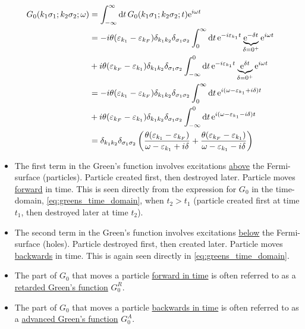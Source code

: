 \begin{align*} 
G_0(k_1\sigma_1;k_2\sigma_2;\omega) &= \int_{-\infty}^\infty\dd{t}G_0(k_1\sigma_1;k_2\sigma_2 ; t)\mathrm{e}^{i\omega t} \\
&= -i\theta(\varepsilon_{k_1} - \varepsilon_{k_F})\delta_{k_1k_2}\delta_{\sigma_1\sigma_2}\int_{0}^\infty\dd{t}\mathrm{e}^{-i\varepsilon_{k_1}t}\underbrace{\mathrm{e}^{-\delta t}}_{\delta = 0^+}\mathrm{e}^{i\omega t} \\
&+ i\theta(\varepsilon_{k_F} - \varepsilon_{k_1})\delta_{k_1k_2}\delta_{\sigma_1\sigma_2}\int_{-\infty}^0\dd{t}\mathrm{e}^{-i\varepsilon_{k_1}t}\underbrace{\mathrm{e}^{\delta t}}_{\delta = 0^+}\mathrm{e}^{i\omega t} \\
&= -i\theta(\varepsilon_{k_1} - \varepsilon_{k_F})\delta_{k_1k_2}\delta_{\sigma_1\sigma_2}\int_{0}^\infty \dd{t}\mathrm{e}^{i(\omega -\varepsilon_{k_1} + i\delta)t} \\
& + i\theta(\varepsilon_{k_F} - \varepsilon_{k_1})\delta_{k_1k_2}\delta_{\sigma_1\sigma_2}\int_{-\infty}^0\dd{t}\mathrm{e}^{i(\omega-\varepsilon_{k_1}-i\delta)t} \\
&= \delta_{k_1k_2}\delta_{\sigma_1\sigma_2}\left( \frac{\theta(\varepsilon_{k_1} - \varepsilon_{k_F})}{\omega-\varepsilon_{k_1} + i\delta} + \frac{\theta(\varepsilon_{k_F}-\varepsilon_{k_1})}{\omega - \varepsilon_{k_1} - i\delta} \right)
\end{align*}
\begin{itemize}
	\item The first term in the Green's function involves excitations \underline{above} the Fermi-surface (particles).
	Particle created first, then destroyed later. Particle moves \underline{forward} in time. This is seen directly from the expression for $G_0$ in the time-domain, \cref{eq:greens_time_domain}, when $t_2 > t_1$ (particle created first at time $t_1$, then destroyed later at time $t_2$).
	\item The second term in the Green's function involves excitations \underline{below} the Fermi-surface (holes).
	Particle destroyed first, then created later. Particle moves \underline{backwards} in time. This is again seen directly in \cref{eq:greens_time_domain}.
	\item The part of $G_0$ that moves a particle \underline{forward in time} is often referred to as a \underline{retarded Green's function} $G_0^R$.
	\item The part of $G_0$ that moves a particle \underline{backwards in time} is often referred to as a \underline{advanced Green's function} $G_0^A$.
\end{itemize}


